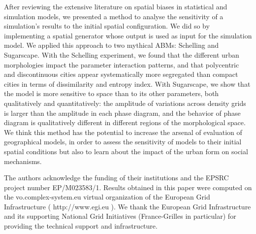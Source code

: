 \documentclass[Royal,sageh,times]{sagej}
\begin{document}
After reviewing the extensive literature on spatial biases in statistical and simulation models, we presented a method to analyse the sensitivity of a simulation's results to the initial spatial configuration. We did so by implementing a spatial generator whose output is used as input for the simulation model. We applied this approach to two mythical ABMs: Schelling and Sugarscape. With the Schelling experiment, we found that the different urban morphologies impact the parameter interaction patterns, and that polycentric and discontinuous cities appear systematically more segregated than compact cities in terms of dissimilarity and entropy index. With Sugarscape, we show that the model is more sensitive to space than to its other parameters, both qualitatively and quantitatively: the amplitude of variations across density grids is larger than the amplitude in each phase diagram, and the behavior of phase diagram is qualitatively different in different regions of the morphological space. We think this method has the potential to increase the arsenal of evaluation of geographical models, in order to assess the sensitivity of models to their initial spatial conditions but also to learn about the impact of the urban form on social mechanisms.

\begin{acks}
The authors acknowledge the funding of their institutions and the EPSRC project number EP/M023583/1. Results obtained in this paper were computed on the vo.complex-system.eu virtual organization of the European Grid Infrastructure ( http://www.egi.eu ). We thank the European Grid Infrastructure and its supporting National Grid Initiatives (France-Grilles in particular) for providing the technical support and infrastructure.
\end{acks}








\end{document}
